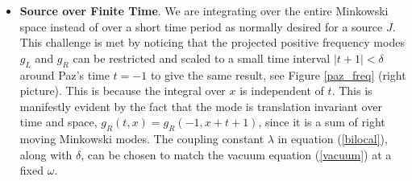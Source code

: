\documentclass[12pt,a4paper]{article}
\begin{document}
{\begin{itemize}
\item{\bf Source over Finite Time}. We are integrating over the entire Minkowski space instead of over a short time period as normally desired for a source $J$.  This challenge is met by noticing that the projected positive frequency modes $g_L$ and $g_R$ can be restricted and scaled to a small time interval $|t + 1| < \delta$ around Paz's time $t=-1$ to give the same result, see Figure \ref{paz_freq} (right picture). This is because the integral over $x$ is independent of $t$. This is manifestly evident by the fact that the mode is translation invariant over time and space, $g_R(t,x) = g_R(-1,x+t+1)$, since it is a sum of right moving Minkowski modes. The coupling constant $\lambda$ in equation (\ref{bilocal}), along with $\delta$, can be chosen to match the vacuum equation (\ref{vacuum}) at a fixed $\omega$.


\end{itemize}}
\end{document}
